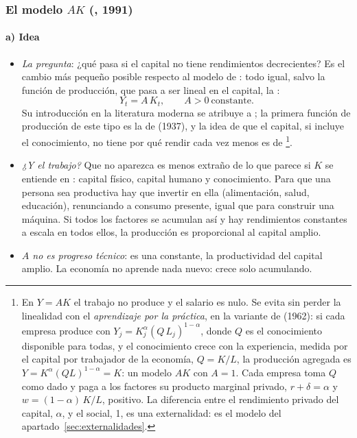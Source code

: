 \documentclass[11pt]{article}
\begin{document}
\subsubsection{El modelo $AK$ (, 1991)}\label{sec:ak}

\paragraph{a) Idea}

\begin{itemize}
\item \emph{La pregunta}: ¿qué pasa si el capital no tiene rendimientos decrecientes? Es el cambio más pequeño posible respecto al modelo de : todo igual, salvo la función de producción, que pasa a ser lineal en el capital, la :
  \begin{equation}
  Y_t=A\,K_t,\qquad A>0\ \text{constante}.\label{eq:ak}
  \end{equation}
  Su introducción en la literatura moderna se atribuye a \textcite{Rebelo1991Long}; la primera función de producción de este tipo es la de  (1937)\nocite{BarroSalaiMartin2004}, y la idea de que el capital, si incluye el conocimiento, no tiene por qué rendir cada vez menos es de \textcite{Knight1944Diminishing}\footnote{\label{nota:ak-salario}En $Y=AK$ el trabajo no produce y el salario es nulo. Se evita sin perder la linealidad con el \emph{aprendizaje por la práctica}, en la variante de  (1962): si cada empresa produce con $Y_j=K_j^{\alpha}(Q\,L_j)^{1-\alpha}$, donde $Q$ es el conocimiento disponible para todas, y el conocimiento crece con la experiencia, medida por el capital por trabajador de la economía, $Q=K/L$, la producción agregada es $Y=K^{\alpha}(QL)^{1-\alpha}=K$: un modelo $AK$ con $A=1$. Cada empresa toma $Q$ como dado y paga a los factores su producto marginal privado, $r+\delta=\alpha$ y $w=(1-\alpha)\,K/L$, positivo. La diferencia entre el rendimiento privado del capital, $\alpha$, y el social, 1, es una externalidad: es el modelo del apartado~\ref{sec:externalidades}\nocite{BarroSalaiMartin2004}.}.
\item \emph{¿Y el trabajo?} Que no aparezca es menos extraño de lo que parece si $K$ se entiende en : capital físico, capital humano y conocimiento. Para que una persona sea productiva hay que invertir en ella (alimentación, salud, educación), renunciando a consumo presente, igual que para construir una máquina. Si todos los factores se acumulan así y hay rendimientos constantes a escala en todos ellos, la producción es proporcional al capital amplio\nocite{SalaiMartin2000}.
\item \emph{$A$ no es progreso técnico}: es una constante, la productividad del capital amplio. La economía no aprende nada nuevo: crece solo acumulando.
\end{itemize}
\end{document}
